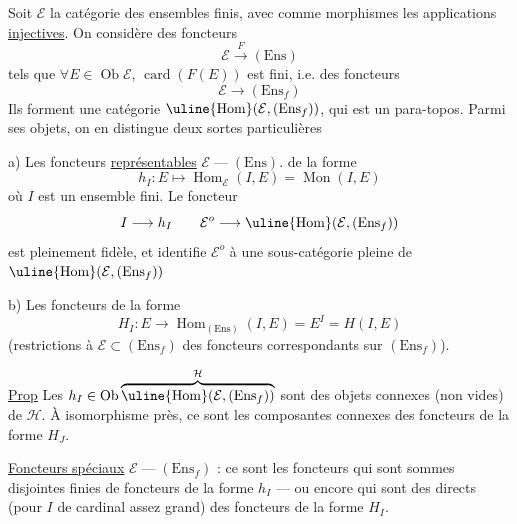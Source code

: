 Soit $\mathcal E$ la catégorie des ensembles finis, avec comme
morphismes les applications \uline{injectives}. On
considère des foncteurs
\[
\mathcal E\xrightarrow{F}(\mathrm{Ens})
\]
tels que $\forall E\in\operatorname{Ob}\mathcal E$, $\operatorname{card}(F(E))$ est fini, i.e. des
foncteurs
\[
\mathcal E\longrightarrow(\mathrm{Ens}_f)
\]
Ils forment une catégorie $\uline{\operatorname{Hom}}(\mathcal E,(\mathrm{Ens}_f))$,
qui est un para-topos. Parmi ses objets, on
en distingue deux sortes particulières

a) Les foncteurs \uline{représentables} $\mathcal E\mathbin{\text{---}}(\mathrm{Ens})$.
de la forme
\[
h_I:E\longmapsto\operatorname{Hom}_{\mathcal E}(I,E)=\operatorname{Mon}(I,E)
\]
où $I$ est un ensemble fini. Le foncteur
\[
I\longrightarrow h_I\qquad\mathcal E^o\longrightarrow\uline{\operatorname{Hom}}(\mathcal E,(\mathrm{Ens}_f))
\]
est pleinement fidèle, et identifie $\mathcal E^o$ à
une sous-catégorie pleine de $\uline{\operatorname{Hom}}(\mathcal E,(\mathrm{Ens}_f))$

b) Les foncteurs de la forme
\[
H_I:E\longrightarrow\operatorname{Hom}_{(\mathrm{Ens})}(I,E)=E^I=H(I,E)
\]
(restrictions à $\mathcal E\subset(\mathrm{Ens}_f)$ des foncteurs
correspondants sur $(\mathrm{Ens}_f)$).

\uline{Prop} Les $h_I\in\operatorname{Ob}\overbrace{\uline{\operatorname{Hom}}(\mathcal E,(\mathrm{Ens}_f))}^{\mathcal H}$ sont des
objets connexes (non vides) de $\mathcal H$. À isomorphisme
près, ce sont les composantes connexes des
foncteurs de la forme $H_J$.

\uline{Foncteurs spéciaux} $\mathcal E\mathbin{\text{---}}(\mathrm{Ens}_f)$ : ce sont les
foncteurs qui sont  sommes disjointes finies
de foncteurs de la forme $h_I$ --- ou encore
qui sont des  directs
(pour $I$ de cardinal assez grand) des
foncteurs de la forme $H_I$.

